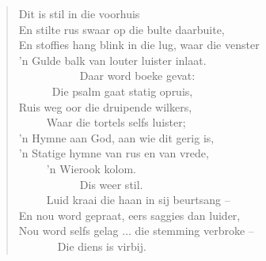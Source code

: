 \begin{verse}
Dit is stil in die voorhuis \\
En stilte rus swaar op die bulte daarbuite, \\
En stoffies hang blink in die lug, waar die venster \\
’n Gulde balk van louter luister inlaat. \\
\ \ \ \ \ \ \ \ \ \ \ Daar word boeke gevat: \\
\ \ \ \ \ \ Die psalm gaat statig opruis, \\
Ruis weg oor die druipende wilkers, \\
\ \ \ \ \ Waar die tortels selfs luister; \\
’n Hymne aan God, aan wie dit gerig is, \\
’n Statige hymne van rus en van vrede, \\
\ \ \ \ \ ’n Wierook kolom. \\
\ \ \ \ \ \ \ \ \ \ \ Dis weer stil. \\
\ \ \ \ \ Luid kraai die haan in sij beurtsang -- \\
En nou word gepraat, eers saggies dan luider, \\
Nou word selfs gelag ... die stemming verbroke -- \\
\ \ \ \ \ \ \ Die diens is virbij. \\
\end{verse}